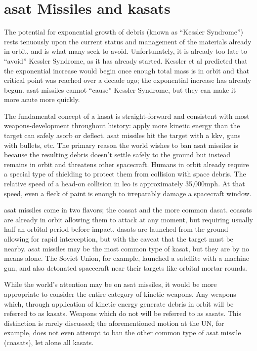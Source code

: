 \section*{\ac{asat} Missiles and \acfp{kasat}}

The potential for exponential growth of debris (known as ``Kessler
Syndrome'') rests tenuously upon the current status and management of
the materials already in orbit, and is what many seek to avoid.
Unfortunately, it is already too late to ``avoid'' Kessler Syndrome,
as it has already started.  Kessler et al predicted that the
exponential increase would begin once enough total mass is in orbit
and that critical point was reached over a decade ago; the exponential
increase has already begun.  \ac{asat} missiles cannot ``cause''
Kessler Syndrome, but they can make it more acute more quickly.

The fundamental concept of a \ac{kasat} is straight-forward and
consistent with most weapons-development throughout history: apply
more kinetic energy than the target can safely asorb or deflect.
\ac{asat} missiles hit the target with a \ac{kkv}, guns with bullets,
etc.  The primary reason the world wishes to ban \ac{asat} missiles is
because the resulting debris doesn't settle safely to the ground but
instead remains in orbit and threatens other spacecraft.  Humans in
orbit already require a special type of shielding to protect them from
collision with space debris.  The relative speed of a head-on
collision in \ac{leo} is approximately 35,000mph.  At that speed, even
a fleck of paint is enough to irreparably damage a spacecraft window.

\ac{asat} missiles come in two flavors; the \acf{coasat} and the more
common \acf{dasat}.  \acp{coasat} are already in orbit allowing them
to attack at any moment, but requiring usually half an orbital period
before impact.  \acp{dasat} are launched from the ground allowing for
rapid interception, but with the caveat that the target must be
nearby.  \ac{asat} missiles may be the most common type of \ac{kasat},
but they are by no means alone.  The Soviet Union, for example,
launched a satellite with a machine gun, and also detonated spacecraft
near their targets like orbital mortar rounds.

While the world's attention may be on \ac{asat} missiles, it would be
more appropriate to consider the entire category of kinetic weapons.
Any weapons which, through application of kinetic energy generate
debris in orbit will be referred to as \acp{kasat}.  Weapons which do
not will be referred to as \acp{sasat}.  This distinction is rarely
discussed; the aforementioned motion at the UN, for example, does not
even attempt to ban the other common type of \ac{asat} missile
(\acp{coasat}), let alone all \acp{kasat}.

